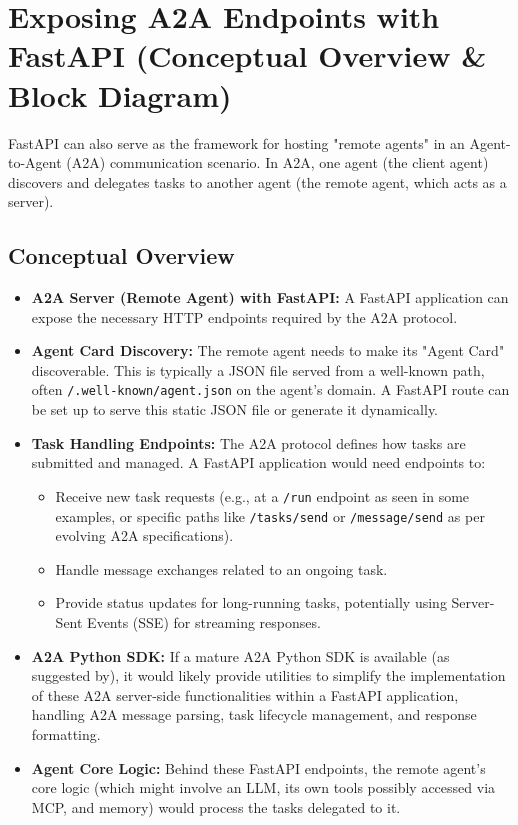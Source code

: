 \section{Exposing A2A Endpoints with FastAPI (Conceptual Overview \& Block Diagram)}
FastAPI can also serve as the framework for hosting "remote agents" in an Agent-to-Agent (A2A) communication scenario. In A2A, 
one agent (the client agent) discovers and delegates tasks to another agent (the remote agent, which acts as a server).

\subsection*{Conceptual Overview}
\begin{itemize}
    \item \textbf{A2A Server (Remote Agent) with FastAPI:} A FastAPI application can expose the necessary HTTP endpoints required by the A2A protocol.
    \item \textbf{Agent Card Discovery:} The remote agent needs to make its "Agent Card" discoverable. 
    This is typically a JSON file served from a well-known path, often \texttt{/.well-known/agent.json} on the agent's domain. 
    A FastAPI route can be set up to serve this static JSON file or generate it dynamically.
    \item \textbf{Task Handling Endpoints:} The A2A protocol defines how tasks are submitted and managed. A FastAPI application would need endpoints to:
    \begin{itemize}
        \item Receive new task requests (e.g., at a \texttt{/run} endpoint as seen in some examples, or specific paths like \texttt{/tasks/send} 
        or \texttt{/message/send} as per evolving A2A specifications).
        \item Handle message exchanges related to an ongoing task.
        \item Provide status updates for long-running tasks, potentially using Server-Sent Events (SSE) for streaming responses.
    \end{itemize}
    \item \textbf{A2A Python SDK:} If a mature A2A Python SDK is available (as suggested by), it would likely provide utilities to 
    simplify the implementation of these A2A server-side functionalities within a FastAPI application, handling A2A message parsing, 
    task lifecycle management, and response formatting.
    \item \textbf{Agent Core Logic:} Behind these FastAPI endpoints, the remote agent's core logic (which might involve an LLM, 
    its own tools possibly accessed via MCP, and memory) would process the tasks delegated to it.
\end{itemize}

